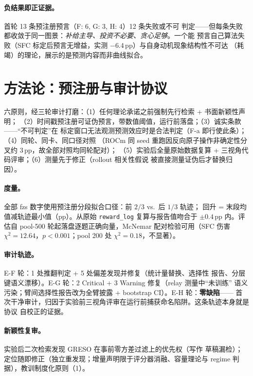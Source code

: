 \documentclass[11pt]{article}
\theoremstyle{definition}
\begin{document}
\paragraph{负结果即正证据。}首轮 13 条预注册预言（F: 6, G: 3, H: 4）12 条失败或不可
判定——但每条失败都收敛于同一图景：\emph{补给主导、投资不必要、贪心足够}。一个能
预言自己算法失败（SFC 标定后预言无增益，实测 $-6.4$\,pp）与自身动机现象结构性不可达
（耗竭）的理论，展示的是预测内容而非曲线拟合。

\section{方法论：预注册与审计协议}\label{sec:method}
六原则，经三轮审计打磨：（1）任何理论承诺之前强制先行检索 + 书面新颖性声明；
（2）时间戳预注册可证伪预言，带数值阈值，运行前落盘；（3）诚实条款——“不可判定”在
标定窗口无法观测预测效应时是合法判定（F-a 即行使此条）；（4）同轮、同卡、同口径对照
（ROCm 同 seed 重跑因反向原子操作非确定性分叉约 3\,pp，故全部对照均同轮配对）；
（5）实验后全量原始数据复算 + 三视角代码评审；（6）测量先于修正（rollout 相关性假说
被直接测量证伪后才替换归因）。

\paragraph{度量。}全部 fzs 数字使用预注册分段拟合口径：前 $2/3$ vs.\ 后 $1/3$ 轨迹；
回升 = 末段均值减轨迹最小值（pp）。从原始 \texttt{reward\_log} 复算与报告值吻合于
$\pm0.4$\,pp 内。评估自 pool-500 轮起落盘逐题正确向量，McNemar 配对检验可用（SFC
伤害 $\chi^2{=}12.64$，$p{<}0.001$；pool 200 处 $\chi^2{=}0.18$，不显著）。

\paragraph{审计轨迹。}E-F 轮：1 处推翻判定 + 5 处偏差发现并修复（统计量替换、选择性
报告、分层键语义漂移）。E-G 轮：2 Critical + 3 Warning 修复（relay 测量中“未训练”
语义污染；臂间选择性报告改为全臂披露 + bootstrap CI）。E-H 轮：\textbf{零缺陷}——
首次干净审计，归因于实验前三视角评审在运行前捕获命名陷阱。这条轨迹本身就是协议
自校正的证据。

\paragraph{新颖性复审。}实验后二次检索发现 GRESO 在事前零方差过滤上的优先权（写作
草稿漏检）；定位随即修正（独立重发现；增量声明限于评分器消融、容量理论与 regime
判据），教训制度化原则（1）。
\end{document}
